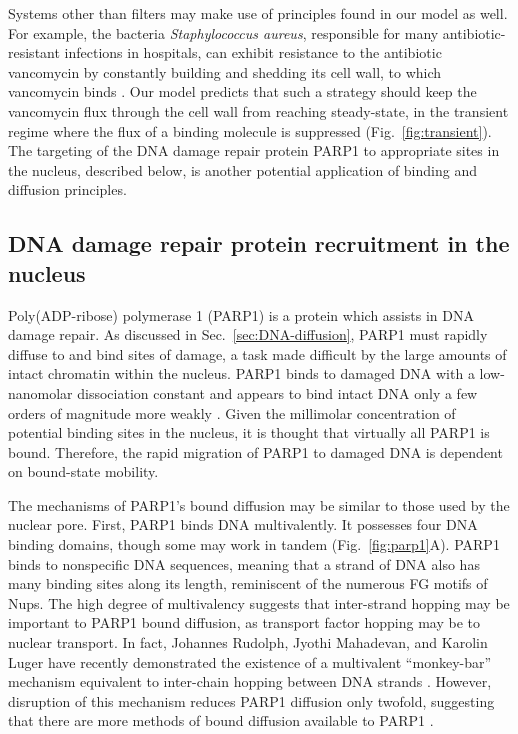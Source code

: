 Systems other than filters may make use of principles found in our model as well.  For example, the bacteria \textit{Staphylococcus aureus}, responsible for many antibiotic-resistant infections in hospitals, can exhibit resistance to the antibiotic vancomycin by constantly building and shedding its cell wall, to which vancomycin binds \cite{mcguinness17}.  Our model predicts that such a strategy should keep the vancomycin flux through the cell wall from reaching steady-state, in the transient regime where the flux of a binding molecule is suppressed (Fig.~\ref{fig:transient}).  The targeting of the DNA damage repair protein PARP1 to appropriate sites in the nucleus, described below, is another potential application of binding and diffusion principles.

\subsection{DNA damage repair protein recruitment in the nucleus}
\label{sec:parp1}

Poly(ADP-ribose) polymerase 1 (PARP1) is a protein  which assists in DNA damage repair.  As discussed in Sec.~\ref{sec:DNA-diffusion}, PARP1 must rapidly diffuse to and bind sites of damage, a task made difficult by the large amounts of intact chromatin within the nucleus.  PARP1 binds to damaged DNA with a low-nanomolar dissociation constant and appears to bind intact DNA only a few orders of magnitude more weakly \cite{rudolph18,sukhanova16}.  Given the millimolar concentration of potential binding sites in the nucleus, it is thought that virtually all PARP1 is bound.  Therefore, the rapid migration of PARP1 to damaged DNA is dependent on bound-state mobility.

The mechanisms of PARP1's bound diffusion may be similar to those used by the nuclear pore.  First, PARP1 binds DNA multivalently.  It possesses four DNA binding domains, though some may work in tandem (Fig.~\ref{fig:parp1}A).  PARP1 binds to nonspecific DNA sequences, meaning that a strand of DNA also has many binding sites along its length, reminiscent of the numerous FG motifs of Nups.  The high degree of multivalency suggests that inter-strand hopping may be important to PARP1 bound diffusion, as transport factor hopping may be to nuclear transport.  In fact, Johannes Rudolph, Jyothi Mahadevan, and Karolin Luger have recently demonstrated the existence of a multivalent ``monkey-bar'' mechanism equivalent to inter-chain hopping between DNA strands \cite{rudolph18}.  However, disruption of this mechanism reduces PARP1 diffusion only twofold, suggesting that there are more methods of bound diffusion available to PARP1 \cite{mahadevan18}.

